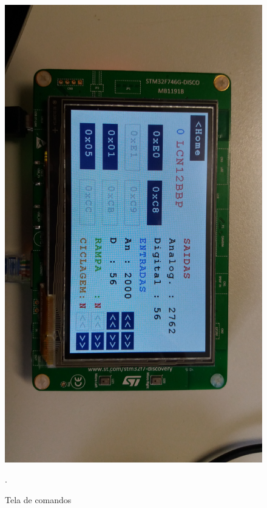 \begin{frame}
\begin{columns}
\begin{column}{0.49\textwidth}
\begin{figure}
	\includegraphics[width=\textwidth]{image/stm32-2}
	\label{fig:2}
	\caption {Tela de comandos}.
	\end{figure}
\end{column}
\end{columns}
\end{frame}